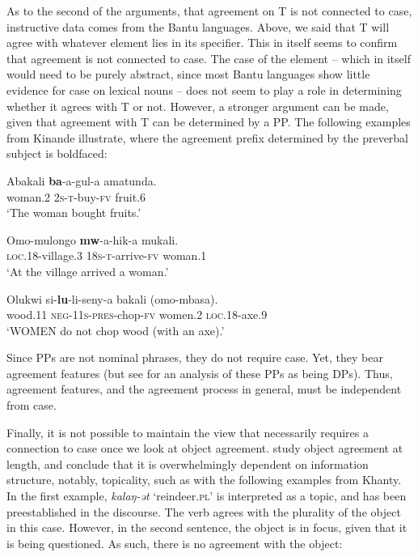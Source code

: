 \documentclass[output=paper
,modfonts
,nonflat]{langsci/langscibook}
\begin{document}
As to the second of the arguments, that agreement on T is not connected to case, instructive data comes from the Bantu languages.
Above, we said that T will agree with whatever element lies in its specifier.
This in itself seems to confirm that agreement is not connected to case. The case of the element -- which in itself would need to be purely abstract, since most Bantu languages show little evidence for case on lexical nouns -- does not seem to play a role in determining whether it agrees with T or not.
However, a stronger argument can be made, given that agreement with T can be determined by a PP.
The following examples from Kinande illustrate, where the agreement prefix determined by the preverbal subject is boldfaced:

\begin{exe}
	\ex 
	\begin{xlist}
		\ex
		\gll Abakali \textbf{ba}-a-gul-a amatunda.\\
		woman.\textsc{2} \textsc{2s-t}-buy-\textsc{fv} fruit.\textsc{6}\\
		\glt `The woman bought fruits.'
		
		\ex 
		\gll Omo-mulongo \textbf{mw}-a-hik-a mukali.\\
		\textsc{loc.18}-village.\textsc{3} \textsc{18s-t}-arrive-\textsc{fv} woman.\textsc{1}\\
		\glt `At the village arrived a woman.'
		
		\ex 
		\gll Olukwi si-\textbf{lu}-li-seny-a bakali (omo-mbasa).\\
		wood.\textsc{11} \textsc{neg-11s-pres}-chop-\textsc{fv} women.\textsc{2} \textsc{loc.18}-axe.\textsc{9}\\
		\glt `WOMEN do not chop wood (with an axe).'
		
	\end{xlist}
\end{exe}
Since PPs are not nominal phrases, they do not require case.
Yet, they bear agreement features (but see \citealt{Carstens1997} for an analysis of these PPs as being DPs). Thus, agreement features, and the agreement process in general, must be independent from case.

Finally, it is not possible to maintain the view that {\agr} necessarily requires a connection to case once we look at object agreement.
\citet{dn2011} study object agreement at length, and conclude that it is overwhelmingly dependent on information structure, notably, topicality, such as with the following examples from Khanty.
In the first example, \textit{kalaŋ-ət} `reindeer.\textsc{pl}' is interpreted as a topic, and has been preestablished in the discourse. The verb agrees with the plurality of the object in this case.
However, in the second sentence, the object is in focus, given that it is being questioned.
As such, there is no agreement with the object:
\end{document}
